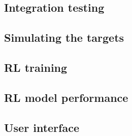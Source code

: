 \documentclass[../main.tex]{subfiles}
\begin{document}
\subsection{Integration testing}

\subsection{Simulating the targets}

\lipsum[1]

\subsection{RL training}

\lipsum[1]

\subsection{RL model performance}

\lipsum[1]

\subsection{User interface}

\lipsum[1]
\end{document}
